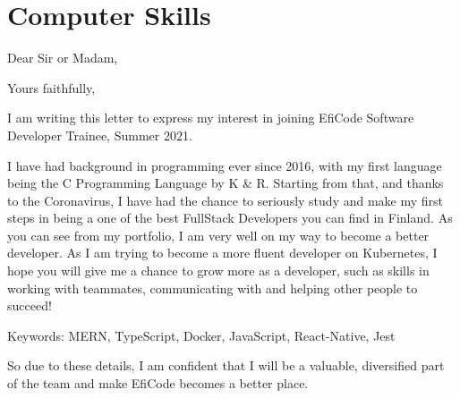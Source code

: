 \documentclass[11pt,a4paper,sans]{moderncv}
\begin{document}
  \clearpage

  \section{Computer Skills}

  \clearpage

  \date{February 8, 2021}
  \opening{Dear Sir or Madam,}
  \closing{Yours faithfully,}
  \makelettertitle

  I am writing this letter to express my interest in joining
  EfiCode Software Developer Trainee, Summer 2021.

  I have had background in programming ever since 2016, with my
  first language being the C Programming Language by K \& R. Starting
  from that, and thanks to the Coronavirus, I have had the chance
  to seriously study and make my first steps in being a
  one of the best FullStack Developers you can find in Finland.
  As you can see from my portfolio, I am very well on my way to become
  a better developer. As I am trying to become a more fluent developer on Kubernetes,
  I hope you will give me a chance to grow more as a developer,
  such as skills in working with teammates, communicating with and helping other
  people to succeed!

  Keywords: MERN, TypeScript, Docker, JavaScript, React-Native, Jest

  So due to these details, I am confident that I will be a valuable, diversified
  part of the team and make EfiCode becomes a better place.

  \makeletterclosing
\end{document}
